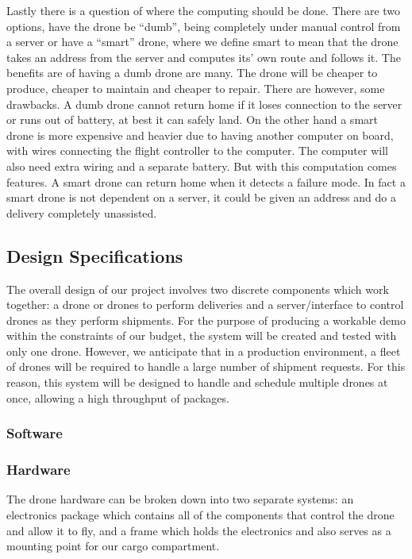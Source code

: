 \documentclass[12pt]{extarticle}
\begin{document}
Lastly there is a question of where the computing should be done. There are two options, have the drone be “dumb”, being completely under manual control from a server or have a “smart” drone, where we define smart to mean that the drone takes an address from the server and computes its’ own route and follows it. The benefits are of having a dumb drone are many. The drone will be cheaper to produce, cheaper to maintain and cheaper to repair. There are however, some drawbacks. A dumb drone cannot return home if it loses connection to the server or runs out of battery, at best it can safely land. On the other hand a smart drone is more expensive and heavier due to having another computer on board, with wires connecting the flight controller to the computer. The computer will also need extra wiring and a separate battery. But with this computation comes features. A smart drone can return home when it detects a failure mode. In fact a smart drone is not dependent on a server, it could be given an address and do a delivery completely unassisted.


\subsection{Design Specifications}

The overall design of our project involves two discrete components which work together: a drone or drones to perform deliveries and a server/interface to control drones as they perform shipments.  For the purpose of producing a workable demo within the constraints of our budget, the system will be created and tested with only one drone.  However, we anticipate that in a production environment, a fleet of drones will be required to handle a large number of shipment requests.  For this reason, this system will be designed to handle and schedule multiple drones at once, allowing a high throughput of packages.    

\subsubsection{Software}

\subsubsection{Hardware}

The drone hardware can be broken down into two separate systems: an electronics package which contains all of the components that control the drone and allow it to fly, and a frame which holds the electronics and also serves as a mounting point for our cargo compartment.  
\end{document}
